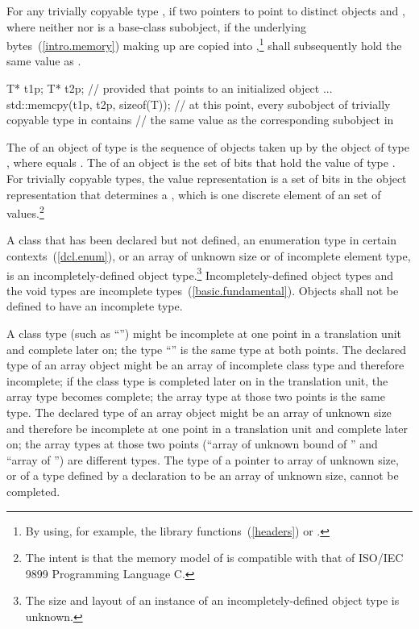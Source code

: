 \pnum
For any trivially copyable type , if two pointers to  point to
distinct  objects  and , where neither
 nor  is a base-class subobject, if the underlying
bytes~(\ref{intro.memory}) making up
 are copied into ,\footnote{By using, for example,
the library functions~(\ref{headers})  or .}
  shall subsequently hold the same value as
. \enterexample

\begin{codeblock}
T* t1p;
T* t2p;
    // provided that  points to an initialized object ...
std::memcpy(t1p, t2p, sizeof(T));
    // at this point, every subobject of trivially copyable type in  contains
    // the same value as the corresponding subobject in 
\end{codeblock}
\exitexample%

\pnum
The 
%
of an object of type  is the
sequence of    objects taken up
by the object of type , where  equals
. The
%
of an object is the set of bits that hold
the value of type . For trivially copyable types, the value representation is
a set of bits in the object representation that determines a
, which is one discrete element of an
 set of values.\footnote{The
intent is that the memory model of \Cpp is compatible
with that of ISO/IEC 9899 Programming Language C.}

\pnum
{}%
A class that has been declared but not defined, an enumeration type in certain
contexts~(\ref{dcl.enum}), or an array of unknown
size or of incomplete element type, is an incompletely-defined object
type.\footnote{The size and layout of an instance of an incompletely-defined
object type is unknown.}
Incompletely-defined object types and the void types are incomplete
types~(\ref{basic.fundamental}). Objects shall not be defined to have an
incomplete type.

\pnum
A class type (such as ``'') might be incomplete at one
point in a translation unit and complete later on; the type
``'' is the same type at both points. The declared type
of an array object might be an array of incomplete class type and
therefore incomplete; if the class type is completed later on in the
translation unit, the array type becomes complete; the array type at
those two points is the same type. The declared type of an array object
might be an array of unknown size and therefore be incomplete at one
point in a translation unit and complete later on; the array types at
those two points (``array of unknown bound of '' and ``array of
 '') are different types. The type of a pointer to array of
unknown size, or of a type defined by a  declaration to
be an array of unknown size, cannot be completed. \enterexample

